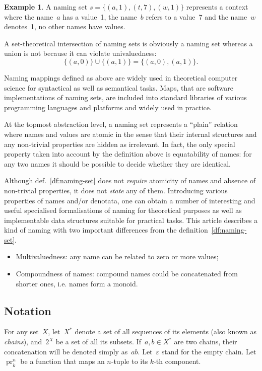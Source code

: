 \documentclass{article}
\theoremstyle{definition}
\newtheorem{Ex}{Example}
\newcommand{\proj}[2]{\operatorname{pr}^{#1}_{#2}}
\begin{document}
\begin{Ex}\label{ex:naming-set}
A naming set $s = \{ (a, 1), (t, 7), (w, 1) \}$ represents a context where
the name~$a$ has a value~1, the name~$b$ refers to a value~7 and the name~$w$
denotes~1, no other names have values.
\end{Ex}

A set-theoretical intersection  of naming sets is obviously a naming set
whereas a union is not because it can violate univaluedness:
\[
  \{ (a, 0) \} \cup \{ (a, 1) \} = \{ (a, 0), (a, 1) \} .
\]

Naming mappings defined as above are widely used in theoretical computer
science for syntactical as well as semantical tasks.
Maps, that are software
implementations of naming sets, are included into standard libraries of various
programming languages and platforms and widely used in practice.

At the topmost abstraction level, a naming set represents a ``plain'' relation
where names and values are atomic in the sense that their internal structures
and any non-trivial properties are hidden as irrelevant.  In fact, the only
special property taken into account by the definition above is equatability of
names: for any two names it should be possible to decide whether they are
identical.

Although def.~\ref{df:naming-set} does not \emph{require} atomicity
of names and absence of non-trivial properties, it does not \emph{state} any of
them.
Introducing various properties of names and/or denotata, one can obtain a
number of interesting and useful specialised formalisations of naming for
theoretical purposes as well as implementable data structures suitable for
practical tasks. This article describes a kind of naming with
two important differences from the definition~\ref{df:naming-set}.
\begin{itemize}
\item Multivaluedness: any name can be related to zero or more values;
\item Compoundness of names: compound names could be concatenated from shorter
ones, i.e. names form a monoid.
\end{itemize}

\subsection*{Notation}

For any set~$X$, let~$X^\ast$ denote a set of all sequences of its elements
(also known as \emph{chains}), and~$2^X$ be a set of all its subsets.
If~$a,b\in X^\ast$ are two chains, their concatenation will be denoted simply
as~$ab$. Let~$\varepsilon$ stand for the empty chain.
Let $\proj{n}{k}$ be a function that maps an $n$-tuple to its $k$-th component.
\end{document}
